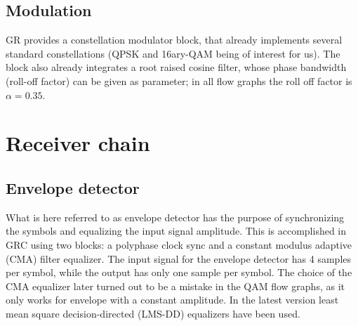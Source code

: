 \subsection{Modulation}

GR provides a constellation modulator block, that already implements several standard constellations (QPSK and 16ary-QAM being of interest for us). The block also already integrates a root raised cosine filter, whose phase bandwidth (roll-off factor) can be given as parameter; in all flow graphs the roll off factor is \(\alpha = 0.35\).

\section{Receiver chain}

\subsection{Envelope detector}

What is here referred to as envelope detector has the purpose of synchronizing the symbols and equalizing the input signal amplitude. This is accomplished in GRC using two blocks: a polyphase clock sync and a constant modulus adaptive (CMA) filter equalizer. The input signal for the envelope detector has 4 samples per symbol, while the output has only one sample per symbol. The choice of the CMA equalizer later turned out to be a mistake in the QAM flow graphs, as it only works for envelope with a constant amplitude. In the latest version least mean square decision-directed (LMS-DD) equalizers have been used.


